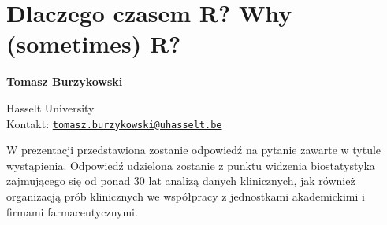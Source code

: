 \documentclass[\main/boa.tex]{subfiles}
\begin{document}
\section{Dlaczego czasem R? Why (sometimes) R?}


\begin{minipage}{0.915\textwidth}
	\centering
  {\bf \huge {} Tomasz Burzykowski}
\end{minipage}


\vskip 0.3cm

\begin{affiliations}
\begin{minipage}{0.915\textwidth}
\centering
\large Hasselt University   \\[5pt]
Kontakt: \href{mailto:tomasz.burzykowski@uhasselt.be}{\nolinkurl{tomasz.burzykowski@uhasselt.be}}\\
\end{minipage}
\end{affiliations}

\vskip 0.8cm

W prezentacji przedstawiona zostanie odpowiedź na pytanie zawarte w tytule wystąpienia. Odpowiedź udzielona zostanie z punktu widzenia biostatystyka zajmującego się od ponad 30 lat analizą danych klinicznych, jak również organizacją prób klinicznych we współpracy z jednostkami akademickimi i firmami farmaceutycznymi. 
\end{document}
